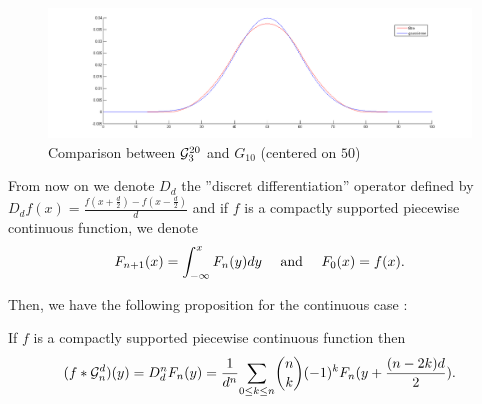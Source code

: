 
\begin{figure}
\centering
\includegraphics[width=15cm]{filtre_g3.png}
\caption{Comparison between $\mathcal{G}_3^{20}$ and $G_{10}$ (centered on $50$)}
\end{figure}

From now on we denote $D_d$ the ''discret differentiation'' operator defined by $D_d f(x)=\frac{f(x+\frac{d}{2})-f(x-\frac{d}{2})}{d}$ and if $f$ is a compactly supported piecewise continuous function, we denote \begin{equation*}
F_{n+1}(x)= \int_{-\infty}^{x}F_{n}(y)dy~~~ \textrm{ and }~~~F_{0}(x)= f(x).
\end{equation*}

Then, we have the following proposition for the continuous case :

\begin{prop} If $f$ is a compactly supported piecewise continuous function then
\begin{equation}
 (f*\mathcal{G}_n^d)(y)=D_d^n F_{n}(y)= \frac{1}{d^n}\underset{0 \le k\le n}{\sum} \binom{n}{k}(-1)^{k} F_{n}(y+\frac{(n-2k)d}{2}).
\end{equation}
\label{continuous_approx}
\end{prop}





